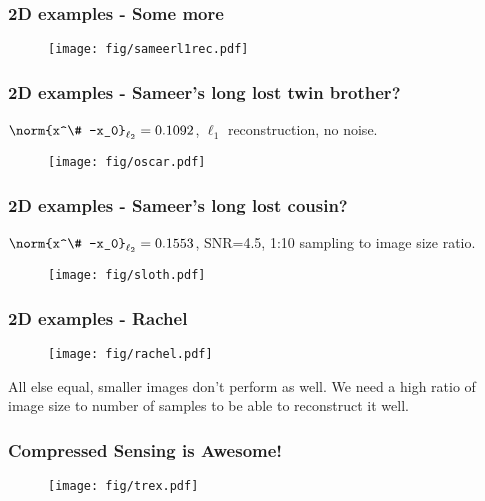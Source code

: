 \iftrue

\begin{frame}[t]
	\frametitle{2D examples - Some more}
\pause
	
\begin{figure}
\centering
\texttt{[image: fig/sameerl1rec.pdf]}
\end{figure}

\end{frame}

\begin{frame}[t]
	\frametitle{2D examples - Sameer's long lost twin brother?}

$\norm{x^\# -x_0}_{\ell_2} = 0.1092$, $\ell_1$ reconstruction, no noise.

\begin{figure}
\centering
\texttt{[image: fig/oscar.pdf]}
\end{figure}


\end{frame}

\begin{frame}[t]
	\frametitle{2D examples - Sameer's long lost cousin?}

$\norm{x^\# -x_0}_{\ell_2} = 0.1553$, SNR=4.5, 1:10 sampling to image size ratio.

\begin{figure}
\centering
\texttt{[image: fig/sloth.pdf]}
\end{figure}


\end{frame}

\fi

\begin{frame}[t]
	\frametitle{2D examples - Rachel}

\begin{figure}
\centering
\texttt{[image: fig/rachel.pdf]}
\end{figure}

All else equal, smaller images don't perform as well. We need a high ratio of image size to number of samples
to be able to reconstruct it well.


\end{frame}

\begin{frame}[t]
	\frametitle{Compressed Sensing is Awesome!}

\begin{figure}
\centering
\texttt{[image: fig/trex.pdf]}
\end{figure}


\end{frame}




